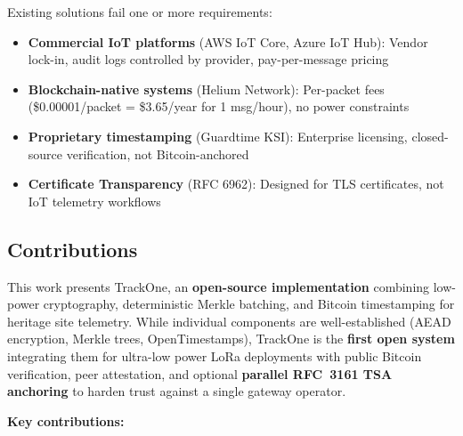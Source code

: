 Existing solutions fail one or more requirements:
\begin{itemize}[nosep]
    \item \textbf{Commercial IoT platforms} (AWS IoT Core, Azure IoT Hub): Vendor lock-in, audit logs controlled by provider, pay-per-message pricing
    \item \textbf{Blockchain-native systems} (Helium Network): Per-packet fees (\$0.00001/packet = \$3.65/year for 1 msg/hour), no power constraints
    \item \textbf{Proprietary timestamping} (Guardtime KSI): Enterprise licensing, closed-source verification, not Bitcoin-anchored
    \item \textbf{Certificate Transparency} (RFC 6962): Designed for \ac{TLS} certificates, not \ac{IoT} telemetry workflows
\end{itemize}

\subsection{Contributions}\label{subsec:contributions}

This work presents TrackOne, an \textbf{open-source implementation} combining low-power cryptography, deterministic Merkle batching, and Bitcoin timestamping for heritage site telemetry.
While individual components are well-established (\ac{AEAD} encryption, Merkle trees, OpenTimestamps), TrackOne is the \textbf{first open system} integrating them for ultra-low power \ac{LoRa} deployments with public Bitcoin verification, peer attestation, and optional \textbf{parallel RFC~3161 TSA anchoring} to harden trust against a single gateway operator.

\textbf{Key contributions:}

